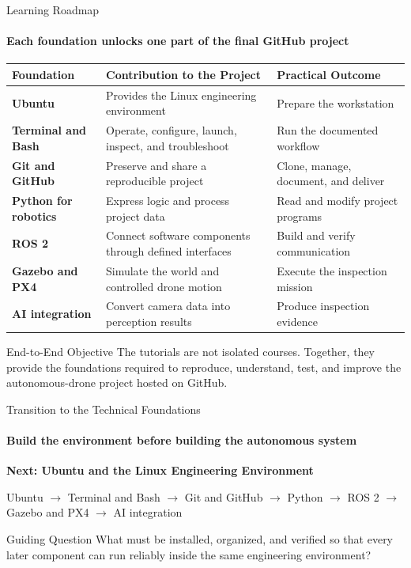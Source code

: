 \begin{frame}{Learning Roadmap}
\framesubtitle{Each foundation unlocks one part of the final GitHub project}
\scriptsize
\renewcommand{\arraystretch}{1.16}
\begin{tabularx}{\textwidth}{>{\bfseries\color{um6p-color-dark-blue}}p{} X >{\centering\arraybackslash}p{}}
\toprule
Foundation & Contribution to the Project & Practical Outcome \\
\midrule
Ubuntu & Provides the Linux engineering environment & Prepare the workstation \\
Terminal and Bash & Operate, configure, launch, inspect, and troubleshoot & Run the documented workflow \\
Git and GitHub & Preserve and share a reproducible project & Clone, manage, document, and deliver \\
Python for robotics & Express logic and process project data & Read and modify project programs \\
ROS 2 & Connect software components through defined interfaces & Build and verify communication \\
Gazebo and PX4 & Simulate the world and controlled drone motion & Execute the inspection mission \\
AI integration & Convert camera data into perception results & Produce inspection evidence \\
\bottomrule
\end{tabularx}
\begin{alertblock}{End-to-End Objective}
The tutorials are not isolated courses. Together, they provide the foundations required to reproduce, understand, test, and improve the autonomous-drone project hosted on GitHub.
\end{alertblock}
\end{frame}

\begin{frame}{Transition to the Technical Foundations}
\framesubtitle{Build the environment before building the autonomous system}
\begin{center}
{\Large\bfseries\color{um6p-dark}
Next: Ubuntu and the Linux Engineering Environment}
\end{center}
\vspace{0.35cm}
\begin{center}
\footnotesize
Ubuntu
$\rightarrow$
Terminal and Bash
$\rightarrow$
Git and GitHub
$\rightarrow$
Python
$\rightarrow$
ROS 2
$\rightarrow$ 
Gazebo and PX4
$\rightarrow$
AI integration
\end{center}
\begin{exampleblock}{Guiding Question}
What must be installed, organized, and verified so that every later component can run reliably inside the same engineering environment?
\end{exampleblock}
\end{frame}
   